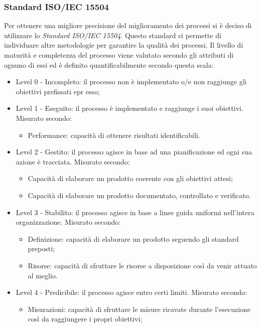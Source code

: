 \subsubsection{Standard ISO/IEC 15504}
Per ottenere una migliore precisione del miglioramento dei processi si è deciso di utilizzare lo \textit{Standard ISO/IEC 15504}.
Questo standard ci permette di individuare altre metodologie per garantire la qualità dei processi.
Il livello di maturità e completezza del processo viene valutato secondo gli attributi di ognuno di essi ed è definito quantificabilmente secondo questa scala:
\begin{itemize}
			\item Level 0 - Incompleto: il processo non è implementato o/e non raggiunge gli obiettivi prefissati epr esso;
			\item Level 1 - Eseguito: il processo è implementato e raggiunge i suoi obiettivi.
			Misurato secondo:
				\begin{itemize}
					\item Performance: capacità di ottenere risultati identificabili.
				\end{itemize}
			\item Level 2 - Gestito: il processo agisce in base ad una pianificazione ed ogni sua azione è tracciata.
			Misurato secondo:
				\begin{itemize}
					\item Capacità di elaborare un prodotto coerente con gli obiettivi attesi;
					\item Capacità di elaborare un prodotto documentato, controllato e verificato.
				\end{itemize}
			\item Level 3 - Stabilito: il processo agisce in base a linee guida uniformi nell'intera organizzazione.
			Misurato secondo:
				\begin{itemize}
					\item Definizione: capacità di elaborare un prodotto seguendo gli standard preposti;
					\item Risorse: capacità di sfruttare le risorse a disposizione così da venir attuato al meglio.
				\end{itemize}
			\item Level 4 - Predicibile: il processo agisce entro certi limiti.
			Misurato secondo:
				\begin{itemize}
					\item Misurazioni: capacità di sfruttare le misure ricavate durante l'esecuzione così da raggiungere i propri obiettivi;

\end{itemize}
\end{itemize}
